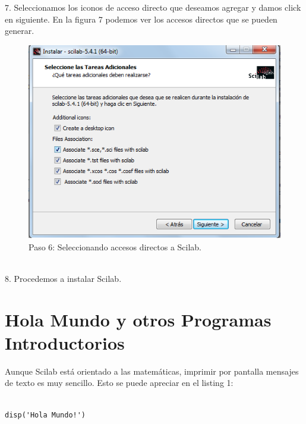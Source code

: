 \documentclass[11pt]{article} %
\begin{document}
7.	Seleccionamos los iconos de acceso directo que deseamos agregar y damos click en siguiente. 
	En la figura 7 podemos ver los accesos directos que se pueden generar.
\\%
\begin{figure}[!h]
  \centering
    \includegraphics[scale=0.5]{Captura6}
  \caption{Paso 6: Seleccionando accesos directos a Scilab.}
  \label{fig:paso6}
\end{figure}
\\%

8.	Procedemos a instalar Scilab.
\\%

\section{Hola Mundo y otros Programas Introductorios}


Aunque Scilab está orientado a las matemáticas, imprimir por pantalla mensajes de texto es muy sencillo. Esto se puede apreciar en el listing 1:
\lstset{language=Scilab}          %
\begin{lstlisting}[caption= Código escrito en Scilab para imprimir por pantalla "Hola Mundo!", label=amb, frame=single]  % Start your code-block

disp('Hola Mundo!')
\end{lstlisting}
\end{document}
